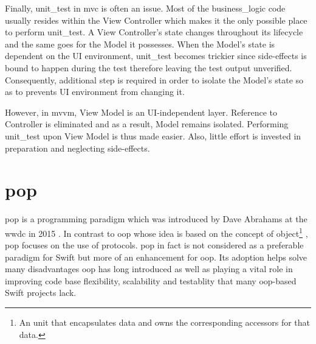 \documentclass[11pt,a4paper,oneside,article]{memoir}
\begin{document}
Finally, \gls{unit_test} in \gls{mvc} is often an issue. Most of the \gls{business_logic} code usually resides within the View Controller which makes it the only possible place to perform \gls{unit_test}. A View Controller's state changes throughout its \gls{lifecycle} and the same goes for the Model it possesses. When the Model's state is dependent on the UI environment, \gls{unit_test} becomes trickier since side-effects is bound to happen during the test therefore leaving the test output unverified. Consequently, additional step is required in order to isolate the Model's state so as to prevents UI environment from changing it. 

However, in \gls{mvvm}, View Model is an UI-independent layer. Reference to Controller is eliminated and as a result, Model remains isolated. Performing \gls{unit_test} upon View Model is thus made easier. Also, little effort is invested in preparation and neglecting side-effects. 


\section{\acrfull{pop}}\label{section:pop}
\gls{pop} %
is a programming paradigm which was introduced by Dave Abrahams at the \gls{wwdc} in 2015 \cite{pop:wwdc}. %
In contrast to \acrfull{oop} %
whose idea is based on the concept of object\footnote{An unit that encapsulates data and owns the corresponding accessors for that data.} \cite{lafore:oop}, \gls{pop} focuses on the use of protocols. \gls{pop} in fact is not considered as a preferable paradigm for Swift but more of an enhancement for \gls{oop}. Its adoption helps solve many disadvantages \gls{oop} has long introduced as well as playing a vital role in improving code base flexibility, scalability and testablity that many \gls{oop}-based Swift projects lack. 
\end{document}
